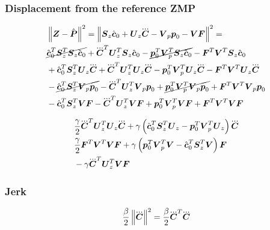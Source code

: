 \subsubsection{Displacement from the reference ZMP}
\begin{equation*}
\begin{split}
    &\norm{\ZMP - \FPh}^2 = 
    \norm{\M{S}_z \cstate_0 + \M{U}_z \cJerk  -  \M{V}_p \fp_0 - \M{V} \FD} ^ 2 = \\
%
%
    &
    \cancel{\cstate_0^T \M{S}_z^T \M{S}_z \cstate_0} 
    + \cJerk^T \M{U}_z^T \M{S}_z \cstate_0
    - \cancel{\fp_0^T \M{V}_p^T \M{S}_z \cstate_0}
    - \FD^T \M{V}^T \M{S}_z \cstate_0 \\
    &
    + \cstate_0^T \M{S}_z^T \M{U}_z \cJerk 
    + \cJerk^T \M{U}_z^T \M{U}_z \cJerk
    - \fp_0^T \M{V}_p^T \M{U}_z \cJerk
    - \FD^T \M{V}^T \M{U}_z \cJerk\\
    &
    - \cancel{\cstate_0^T \M{S}_z^T \M{V}_p \fp_0}
    - \cJerk^T \M{U}_z^T \M{V}_p \fp_0
    + \cancel{\fp_0^T \M{V}_p^T \M{V}_p \fp_0}
    + \FD^T \M{V}^T \M{V}_p \fp_0\\
    &
    - \cstate_0^T \M{S}_z^T \M{V} \FD
    - \cJerk^T \M{U}_z^T \M{V} \FD
    + \fp_0^T \M{V}_p^T \M{V} \FD
    + \FD^T \M{V}^T \M{V} \FD\\
\end{split}
\end{equation*}

\begin{equation*}
\begin{split}
    &
    \frac{\gamma}{2} \cJerk^T \M{U}_z^T \M{U}_z \cJerk
    + 
    \gamma 
    \left(
        \cstate_0^T \M{S}_z^T \M{U}_z
        - 
        \fp_0^T \M{V}_p^T \M{U}_z 
    \right)
    \cJerk\\
    &
    \frac{\gamma}{2} \FD^T \M{V}^T \M{V} \FD
    + 
    \gamma 
    \left(
        \fp_0^T \M{V}_p^T \M{V}
        - 
        \cstate_0^T \M{S}_z^T \M{V}
    \right)
    \FD\\
    &
    - \gamma \cJerk^T \M{U}_z^T \M{V} \FD
\end{split}
\end{equation*}

\subsubsection{Jerk}
\begin{equation*}
    \frac{\beta}{2}  \norm{\cJerk}^2 = \frac{\beta}{2} \cJerk^T \cJerk
\end{equation*}


